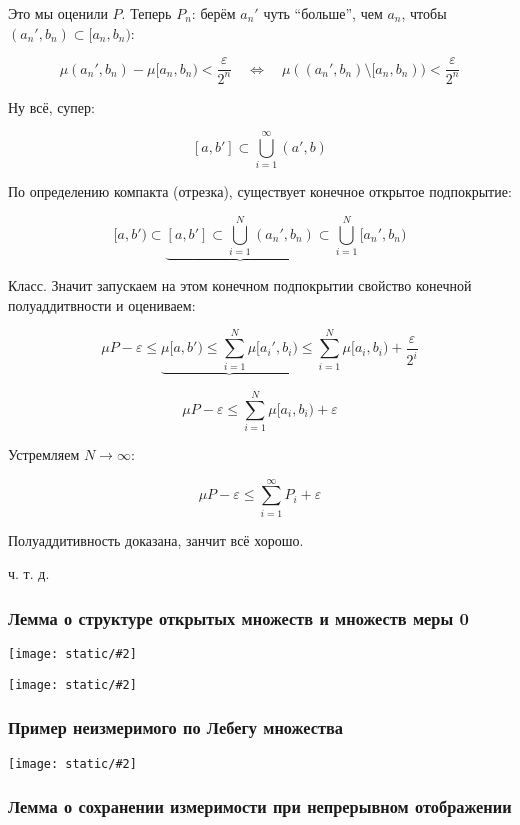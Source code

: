 \documentclass{article}
\def\images#1#2{\begin{center}\texttt{[image: static/\#2]}\end{center}}
\begin{document}
Это мы оценили $P$. Теперь $P_n$: берём $a_n'$ чуть ``больше'', чем $a_n$, чтобы $(a_n', b_n) \subset [a_n, b_n)$:

\[\mu (a_n', b_n) - \mu [a_n, b_n) < \frac{\varepsilon}{2^n} \quad \Leftrightarrow \quad \mu((a_n', b_n) \setminus [a_n, b_n)) < \frac{\varepsilon}{2^n}\]

Ну всё, супер: 

\[[a, b'] \subset \bigcup_{i = 1}^{\infty} (a', b)\]

По определению компакта (отрезка), существует конечное открытое подпокрытие: 

\[[a, b') \subset \underbrace{[a, b'] \subset \bigcup_{i = 1}^{N} (a_n', b_n)} \subset \bigcup_{i = 1}^{N} [a_n', b_n)\]

Класс. Значит запускаем на этом конечном подпокрытии свойство конечной полуаддитвности и оцениваем:

\[ \mu P - \varepsilon \le \underbrace{\mu [a, b') \le \sum_{i = 1}^{N} \mu [a_i', b_i)} \le \sum_{i = 1}^{N} \mu [a_i, b_i) + \frac{\varepsilon}{2^i}\]

\[\mu P - \varepsilon \le \sum_{i = 1}^{N} \mu [a_i, b_i) + \varepsilon\]

Устремляем $ N \rightarrow \infty$: 

\[\mu P - \varepsilon \le \sum_{i = 1}^{\infty} P_i + \varepsilon\]

Полуаддитивность доказана, занчит всё хорошо.

ч. т. д. 



\subsubsection{Лемма о структуре открытых множеств и множеств меры 0}

\images{0.95}{o_str_otkr_0_1.jpg}

\images{1}{o_str_otkr_0_2.jpg}


\subsubsection{Пример неизмеримого по Лебегу множества}

\images{0.95}{pr_neiz_leb_mn.jpg}


\subsubsection{Лемма о сохранении измеримости при непрерывном отображении}
\end{document}
